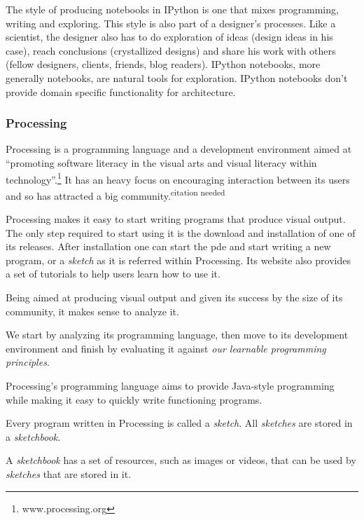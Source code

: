 \documentclass{./llncs2e/llncs}
\begin{document}
	The style of producing notebooks in IPython is one that mixes programming, writing and exploring. 
	This style is also part of a designer's processes. 
	Like a scientist, the designer also has to do exploration of ideas (design ideas in his case), reach conclusions (crystallized designs) and share his work with others (fellow designers, clients, friends, blog readers). 
	IPython notebooks, more generally notebooks, are natural tools for exploration.
	IPython notebooks don't provide domain specific functionality for architecture.
	
\subsubsection{Processing\cite{reas2007processing}}
	Processing is a programming language and a development environment aimed at ``promoting software literacy in the visual arts and visual literacy within technology''.\footnote{www.processing.org} 
	It has an heavy focus on encouraging interaction between its users and so has attracted a big community.\textsuperscript{citation needed}
	
	Processing makes it easy to start writing programs that produce visual output. 
	The only step required to start using it is the download and installation of one of its releases. 
	After installation one can start the \ac{pde} and start writing a new program, or a \emph{sketch} as it is referred within Processing. 
	Its website also provides a set of tutorials to help users learn how to use it.
	
	Being aimed at producing visual output and given its success by the size of its community, it makes sense to analyze it.
	
	We start by analyzing its programming language, then move to its development environment and finish by evaluating it against \emph{our learnable programming principles}.
	
	Processing's programming language aims to provide Java-style programming while making it easy to quickly write functioning programs. 
	
	Every program written in Processing is called a \emph{sketch}. 
	All \emph{sketches} are stored in a \emph{sketchbook}.
	
	A \emph{sketchbook} has a set of resources, such as images or videos, that can be used by \emph{sketches} that are stored in it.
	
\end{document}
